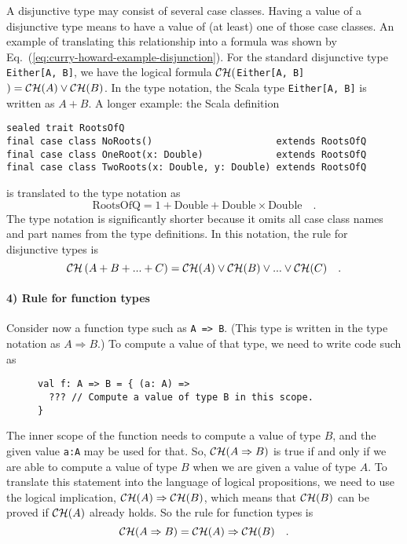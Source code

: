 A disjunctive type may consist of several case classes. Having a value
of a disjunctive type means to have a value of (at least) one of those
case classes. An example of translating this relationship into a formula
was shown by Eq.~(\ref{eq:curry-howard-example-disjunction}). For
the standard disjunctive type \lstinline!Either[A, B]!, we have the
logical formula ${\cal CH}($\lstinline!Either[A, B]!$)={\cal CH}(A)\vee{\cal CH}(B)$.
In the type notation, the Scala type \lstinline!Either[A, B]! is
written as $A+B$. A longer example: the Scala definition
\begin{lstlisting}
sealed trait RootsOfQ
final case class NoRoots()                      extends RootsOfQ
final case class OneRoot(x: Double)             extends RootsOfQ
final case class TwoRoots(x: Double, y: Double) extends RootsOfQ
\end{lstlisting}
is translated to the type notation as
\[
\text{RootsOfQ}=1+\text{Double}+\text{Double}\times\text{Double}\quad.
\]
The type notation is significantly shorter because it omits all case
class names and part names from the type definitions. In this notation,
the rule for disjunctive types is
\[
{\cal CH}\left(A+B+...+C\right)={\cal CH}(A)\vee{\cal CH}(B)\vee...\vee{\cal CH}(C)\quad.
\]


\paragraph{4) Rule for function types}

Consider now a function type such as \lstinline!A => B!. (This type
is written in the type notation as $A\Rightarrow B$.) To compute
a value of that type, we need to write code such as

\begin{wrapfigure}{l}{0.5\columnwidth}%
\vspace{-0.65\baselineskip}
\begin{lstlisting}
val f: A => B = { (a: A) =>
  ??? // Compute a value of type B in this scope.
}
\end{lstlisting}

\vspace{-0.9\baselineskip}
\end{wrapfigure}%

\noindent The inner scope of the function needs to compute a value
of type $B$, and the given value \lstinline!a:A! may be used for
that. So, ${\cal CH}(A\Rightarrow B)$ is true if and only if we are
able to compute a value of type $B$ when we are given a value of
type $A$. To translate this statement into the language of logical
propositions, we need to use the logical implication, ${\cal CH}(A)\Rightarrow{\cal CH}(B)$,
which means that ${\cal CH}(B)$ can be proved if ${\cal CH}(A)$
already holds. So the rule for function types is
\[
{\cal CH}(A\Rightarrow B)={\cal CH}(A)\Rightarrow{\cal CH}(B)\quad.
\]


